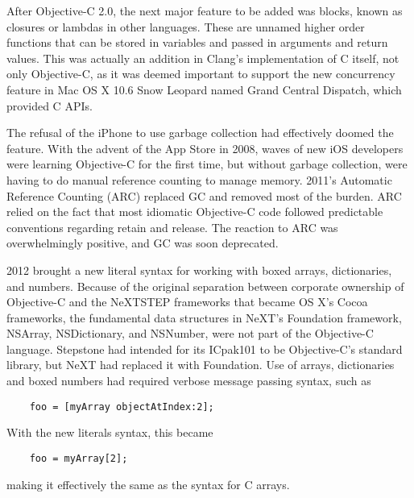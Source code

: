 \documentclass[acmsmall]{acmart}\settopmatter{}
\begin{document}
After Objective-C 2.0, the next major feature to be added was blocks, known as closures or lambdas in other languages. These are unnamed higher order functions that can be stored in variables and passed in arguments and return values. This was actually an addition in Clang's implementation of C itself, not only Objective-C, as it was deemed important to support the new concurrency feature in Mac OS X 10.6 Snow Leopard named Grand Central Dispatch, which provided C APIs.

The refusal of the iPhone to use garbage collection had effectively doomed the feature. With the advent of the App Store in 2008, waves of new iOS developers were learning Objective-C for the first time, but without garbage collection, were having to do manual reference counting to manage memory. 2011's Automatic Reference Counting (ARC) replaced GC and removed most of the burden. ARC relied on the fact that most idiomatic Objective-C code followed predictable conventions regarding retain and release. The reaction to ARC was overwhelmingly positive, and GC was soon deprecated. 

2012 brought a new literal syntax for working with boxed arrays, dictionaries, and numbers. Because of the original separation between corporate ownership of Objective-C and the NeXTSTEP frameworks that became OS X's Cocoa frameworks, the fundamental data structures in NeXT's Foundation framework, NSArray, NSDictionary, and NSNumber, were not part of the Objective-C language. Stepstone had intended for its ICpak101 to be Objective-C's standard library, but NeXT had replaced it with Foundation. Use of arrays, dictionaries and boxed numbers had required verbose message passing syntax, such as 
\begin{verbatim}
    foo = [myArray objectAtIndex:2];
\end{verbatim}
With the new literals syntax, this became 
\begin{verbatim}
    foo = myArray[2];
\end{verbatim}
making it effectively the same as the syntax for C arrays.
\end{document}
